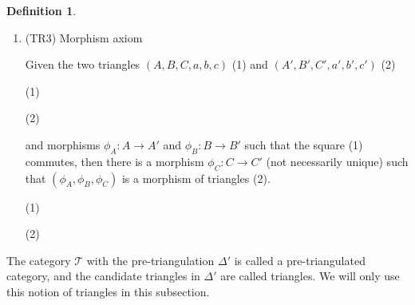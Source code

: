 \documentclass[12pt]{article}
\theoremstyle{definition}
\newtheorem{definition}{Definition}[section]
\theoremstyle{remark}
\begin{document}
\begin{definition}
\begin{enumerate}
\begin{center}
                        \end{center}
                    \item (TR3) Morphism axiom
                    
                        Given the two triangles $(A,B,C,a,b,c)$ (1) and $(A',B',C',a',b',c')$ (2)
                        \begin{center}
                            (1)
                            (2) 
                        \end{center}
                        and morphisms $\phi_A : A \rightarrow A'$ and $\phi_B : B \rightarrow B'$ such that the square (1) commutes, then there is a morphism $\phi_C : C \rightarrow C'$ (not necessarily unique) such that $(\phi_A ,\phi_B ,\phi_C)$ is a morphism of triangles (2).
                        
                        \begin{center}
                            (1)
                            (2)
                        \end{center}
                \end{enumerate}

                The category $\mathcal{T}$ with the pre-triangulation $\Delta '$ is called a pre-triangulated category, and the candidate triangles in $\Delta '$ are called  triangles. We will only use this notion of triangles in this subsection.
            \end{definition}
\end{document}
